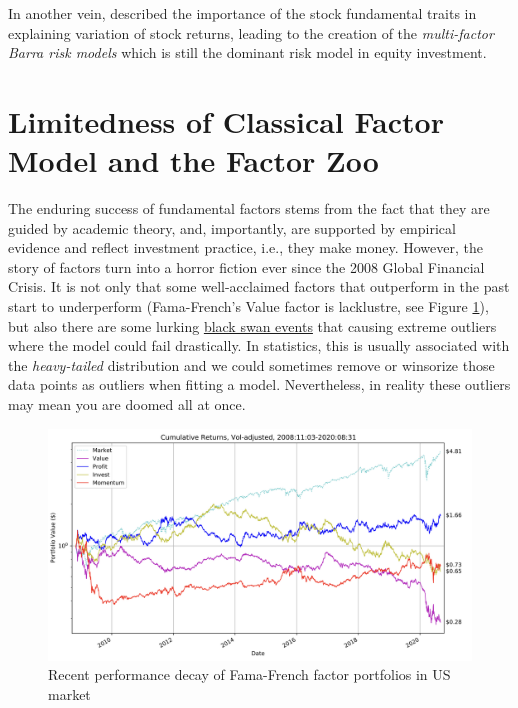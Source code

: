 \documentclass[
]{book}
\begin{document}
In another vein, \citet{rosenberg1974extra} described the importance of the stock fundamental traits in explaining variation of stock returns, leading to the creation of the {\emph{multi-factor Barra risk models}} which is still the dominant risk model in equity investment.

\hypertarget{limitedness-of-classical-factor-model-and-the-factor-zoo}{%
\section{Limitedness of Classical Factor Model and the Factor Zoo}\label{limitedness-of-classical-factor-model-and-the-factor-zoo}}

The enduring success of fundamental factors stems from the fact that they are guided by academic theory, and, importantly, are supported by empirical evidence and reflect investment practice, i.e., they make money. However, the story of factors turn into a horror fiction ever since the 2008 Global Financial Crisis. It is not only that some well-acclaimed factors that outperform in the past start to underperform (Fama-French's Value factor is lacklustre, see Figure \ref{fig:fig-fac-decay}), but also there are some lurking \href{https://en.wikipedia.org/wiki/Black_swan_theory}{black swan events} that causing extreme outliers where the model could fail drastically. In statistics, this is usually associated with the {\emph{heavy-tailed}} distribution and we could sometimes remove or winsorize those data points as outliers when fitting a model. Nevertheless, in reality these outliers may mean you are doomed all at once.

\begin{figure}
\includegraphics[width=0.9\linewidth]{images/chapter3/fac_recent} \caption{Recent performance decay of Fama-French factor portfolios in US market}\label{fig:fig-fac-decay}
\end{figure}
\end{document}

